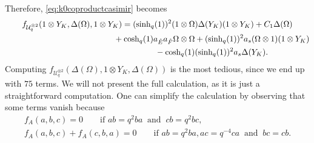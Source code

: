 \documentclass[10pt,a4paper]{amsart}
\numberwithin{equation}{section}
\newcommand{\chq}{\mathrm{cosh}_q}
\newcommand{\shq}{\mathrm{sinh}_q}
\newcommand{\tensor}[1]{^{\otimes{#1}}}
\newcommand{\Uq}{\mathcal{U}_q}
\begin{document}
Therefore, \eqref{eq:k0coproductcasimir} becomes
\begin{gather*} f_{\Uq\tensor{2}}(1\otimes Y_K,\Delta(\Omega),1\otimes Y_K)=(\shq(1))^2(1\otimes \Omega)\Delta(Y_K)(1\otimes Y_K) + C_1\Delta(\Omega) \\
\hphantom{f_{\Uq\tensor{2}}(1\otimes Y_K,\Delta(\Omega),1\otimes Y_K)=}{}
		+ \chq(1)a_{\hat{E}}a_{\hat{F}} \Omega\otimes\Omega + (\shq(1))^2a_s(\Omega\otimes 1)(1\otimes Y_K) \\
\hphantom{f_{\Uq\tensor{2}}(1\otimes Y_K,\Delta(\Omega),1\otimes Y_K)=}{}
		- \chq(1)(\shq(1))^2a_s \Delta(Y_K).
	\end{gather*}
Computing $f_{\Uq\tensor{2}}(\Delta(\Omega),1\otimes Y_K,\Delta(\Omega))$ is the most tedious, since we end up with $75$ terms. We will not present the full calculation, as it is just a straightforward computation. One can simplify the calculation by observing that some terms vanish because
\begin{gather*}
	f_A(a,b,c)=0\qquad \text{if }ab=q^2ba \ \text{ and }\ cb=q^2bc,\\
	f_A(a,b,c)+f_A(c,b,a)=0\qquad \text{if }ab=q^2ba, ac=q^{-4}ca \ \text{ and }\ bc=cb.
\end{gather*}
\end{document}
